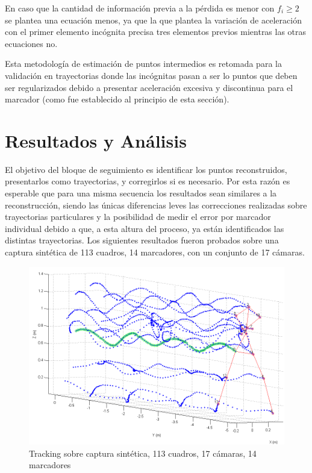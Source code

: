 En caso que la cantidad de información previa a la pérdida es menor con $f_{i} \geq 2$ se plantea una ecuación menos, ya que la que plantea la variación de aceleración con el primer elemento incógnita precisa tres elementos previos mientras las otras ecuaciones no.

Esta metodología de estimación de puntos intermedios es retomada para la validación en trayectorias donde las incógnitas pasan a ser lo puntos que deben ser regularizados debido a presentar aceleración excesiva y discontinua para el marcador (como fue establecido al principio de esta sección).




\section{Resultados y Análisis}

El objetivo del bloque de seguimiento es identificar los puntos reconstruidos, presentarlos como trayectorias, y corregirlos si es necesario. Por esta razón es esperable que para una misma secuencia los resultados sean similares a la reconstrucción, siendo las únicas diferencias leves las correcciones realizadas sobre trayectorias particulares y la posibilidad de medir el error por marcador individual debido a que, a esta altura del proceso, ya están identificados las distintas trayectorias. Los siguientes resultados fueron probados sobre una captura sintética de 113 cuadros, 14 marcadores, con un conjunto de 17 cámaras.

\begin{figure}[H]
\vspace{-0.4cm}
\begin{center}
\includegraphics[scale=0.4]{img/Tracking/040_Salida_Tracking_Esqueleto_Trayectoria.png}
\end{center}
\vspace{-0.5cm}
\caption{Tracking sobre captura sintética, 113 cuadros, 17 cámaras, 14 marcadores}
\label{Tracking_Esqueleto_Trayectoria}
\end{figure}



